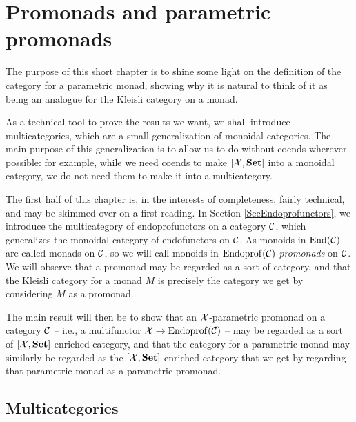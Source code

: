 \chapter{Promonads and parametric promonads}
\label{ChapPromonads}

The purpose of this short chapter is to shine some light on the definition of the \Mellies category for a parametric monad, showing why it is natural to think of it as being an analogue for the Kleisli category on a monad.

As a technical tool to prove the results we want, we shall introduce multicategories, which are a small generalization of monoidal categories.  
The main purpose of this generalization is to allow us to do without coends wherever possible: for example, while we need coends to make $[\mathcal X,{\normalfont\textbf{Set}}]$ into a monoidal category, we do not need them to make it into a multicategory.  

The first half of this chapter is, in the interests of completeness, fairly technical, and may be skimmed over on a first reading.  
In Section \ref{SecEndoprofunctors}, we introduce the multicategory of endoprofunctors on a category ${\mathcal{C}}$, which generalizes the monoidal category of endofunctors on ${\mathcal{C}}$.  
As monoids in $\operatorname{End}({\mathcal{C}})$ are called monads on ${\mathcal{C}}$, so we will call monoids in $\operatorname{Endoprof}({\mathcal{C}})$ \emph{promonads} on ${\mathcal{C}}$.  
We will observe that a promonad may be regarded as a sort of category, and that the Kleisli category for a monad $M$ is precisely the category we get by considering $M$ as a promonad.

The main result will then be to show that an $\mathcal X$-parametric promonad on a category ${\mathcal{C}}$ -- i.e., a multifunctor $\mathcal X \to \operatorname{Endoprof}({\mathcal{C}})$ -- may be regarded as a sort of $[\mathcal X,{\normalfont\textbf{Set}}]$-enriched category, and that the \Mellies category for a parametric monad may similarly be regarded as the $[\mathcal X,{\normalfont\textbf{Set}}]$-enriched category that we get by regarding that parametric monad as a parametric promonad.

\section{Multicategories}

